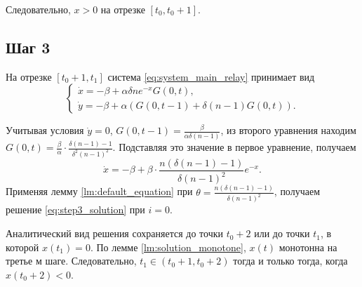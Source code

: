 Следовательно, $x > 0$ на отрезке $[t_0, t_0 + 1]$.

\subsection{Шаг 3}
На отрезке $[t_0 + 1, t_1]$ система \eqref{eq:system_main_relay} принимает вид
\begin{equation}
	\label{eq:system_step3}
	\begin{cases}
		\dot{x} = -\beta + \alpha \delta n e^{-x} G(0, t),\\
		\dot{y} = -\beta + \alpha \left(G(0, t - 1) + \delta (n - 1) G(0, t)\right).
	\end{cases}
\end{equation}

Учитывая условия $\dot{y} = 0$, $G(0, t - 1) = \frac{\beta}{\alpha \delta (n - 1)}$, из второго уравнения находим $G(0, t) = \frac{\beta}{\alpha} \cdot \frac{\delta(n - 1) - 1}{\delta^2 (n - 1)^2}$. Подставляя это значение в первое уравнение, получаем
\[
\dot{x} = -\beta + \beta \cdot \dfrac{n (\delta(n - 1) - 1)}{\delta (n - 1)^2} e^{-x}.
\]
%
Применяя лемму \ref{lm:default_equation} при $\theta = \frac{n (\delta(n - 1) - 1)}{\delta (n - 1)^2}$, получаем решение \eqref{eq:step3_solution} при $i = 0$.

Аналитический вид решения сохраняется до точки $t_0 + 2$ или до точки $t_1$, в которой $x(t_1) = 0$. По лемме \ref{lm:solution_monotone}, $x(t)$ монотонна на третье	м шаге. Следовательно, $t_1 \in (t_0 + 1, t_0 + 2)$ тогда и только тогда, когда $x(t_0 + 2) < 0$.

